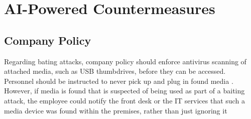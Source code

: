 



\chapter{AI-Powered Countermeasures\label{trainingawareness}}


\section{Company Policy}

Regarding bating attacks, company policy should enforce antivirus scanning of attached media, such as USB thumbdrives, before they can be accessed. Personnel should be instructed to never pick up and plug in found media \citep{salahdine_social_2019}. However, if media is found that is suspected of being used as part of a baiting attack, the employee could notify the front desk or the IT services that such a media device was found within the premises, rather than just ignoring it 
